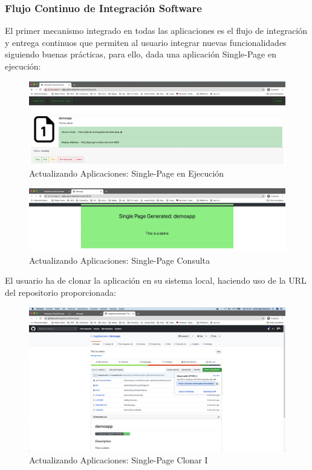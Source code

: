 \documentclass[a4paper,11pt]{book}
\begin{document}
\subsubsection{Flujo Continuo de Integración Software}

El primer mecanismo integrado en todas las aplicaciones es el flujo de integración y entrega continuos que permiten al usuario integrar nuevas funcionalidades siguiendo buenas prácticas, para ello, dada una aplicación Single-Page en ejecución:

\begin{figure}[H]
\centering
\includegraphics[scale=0.25]{imagenes/casouso/2_1_a.png}
\caption{ Actualizando Aplicaciones: Single-Page en Ejecución  }
\end{figure}

\begin{figure}[H]
\centering
\includegraphics[scale=0.25]{imagenes/casouso/2_2_a.png}
\caption{  Actualizando Aplicaciones: Single-Page Consulta }
\end{figure}

 El usuario ha de clonar la aplicación en su sistema local, haciendo uso de la URL del repositorio proporcionada:
 
 \begin{figure}[H]
\centering
\includegraphics[scale=0.2]{imagenes/casouso/2_3.png}
\caption{  Actualizando Aplicaciones: Single-Page Clonar I }
\end{figure}
\end{document}
